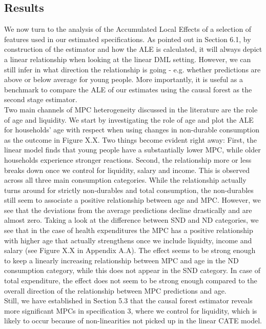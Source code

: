 \subsection{Results}
We now turn to the analysis of the Accumulated Local Effects of a selection of features used in our estimated specifications. As pointed out in Section 6.1, by construction of the estimator and how the ALE is calculated, it will always depict a linear relationship when looking at the linear DML setting. However, we can still infer in what direction the relationship is going - e.g. whether predictions are above or below average for young people. More importantly, it is useful as a benchmark to compare the ALE of our estimates using the causal forest as the second stage estimator. \\
Two main channels of MPC heterogeneity discussed in the literature are the role of age and liquidity. We start by investigating the role of age and plot the ALE for households' age with respect when using changes in non-durable consumption as the outcome in Figure X.X.
Two things become evident right away: First, the linear model finds that young people have a substantially lower MPC, while older households experience stronger reactions. Second, the relationship more or less breaks down once we control for liquidity, salary and income. This is observed across all three main consumption categories. While the relationship actually turns around for strictly non-durables and total consumption, the non-durables still seem to associate a positive relationship between age and MPC. However, we see that the deviations from the average predictions decline drastically and are almost zero. Taking a look at the difference between SND and ND categories, we see that in the case of health expenditures the MPC has a positive relationship with higher age that actually strengthens once we include liquidty, income and salary (see Figure X.X in Appendix A.A). The effect seems to be strong enough to keep a linearly increasing relationship between MPC and age in the ND consumption category, while this does not appear in the SND category. In case of total expenditure, the effect does not seem to be strong enough compared to the overall direction of the relationship between MPC predictions and age. \\
Still, we have established in Section 5.3 that the causal forest estimator reveals more significant MPCs in specification 3, where we control for liquidity, which is likely to occur because of non-linearities not picked up in the linear CATE model. 
